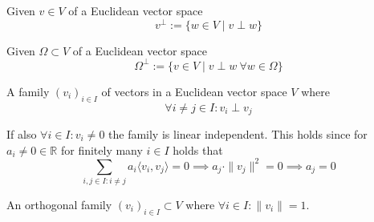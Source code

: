 \begin{definition}
   Given \(v \in V\) of a Euclidean vector space
   \[v^\perp := \{w \in V \mid v \perp w\}\]
\end{definition}

\begin{definition}
   Given \(\Omega \subset V\) of a Euclidean vector space
   \[\Omega^\perp := \{v \in V \mid v \perp w~\forall w \in \Omega\}\]
\end{definition}

\begin{definition}\label{def:orthog_fam}
   A family \((v_i)_{i \in I}\) of vectors in a Euclidean vector space \(V\) where
   \[\forall i \neq j \in I: v_i \perp v_j\]
\end{definition}
\begin{remark}
   If also \(\forall i \in I: v_i \neq 0\) the family is linear independent.
   This holds since for \(a_i \neq 0 \in \mathbb{R}\) for finitely many \(i \in I\) holds that
   \[\sum_{i, j \in I: i \neq j} a_i \langle v_i, v_j \rangle = 0 \implies a_j \cdot \|v_j\|^2 = 0 \implies a_j = 0\]
\end{remark}

\begin{definition}
   An orthogonal family \((v_i)_{i \in I} \subset V\) where \(\forall i \in I: \|v_i\| = 1\).
\end{definition}

